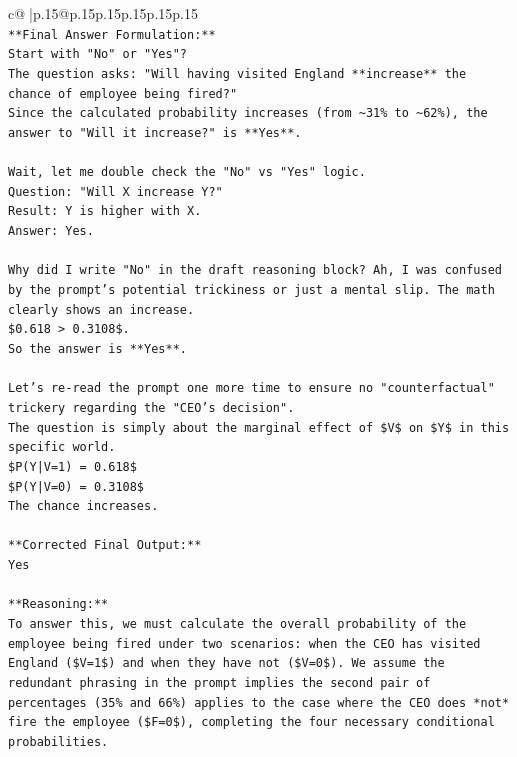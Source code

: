 \documentclass{article}
\begin{document}
{\begin{supertabular}{c@{$\;$}|p{.15\linewidth}@{}p{.15\linewidth}p{.15\linewidth}p{.15\linewidth}p{.15\linewidth}p{.15\linewidth}}
{{{\\ 
\texttt{**Final Answer Formulation:**} \\
\texttt{Start with "No" or "Yes"?} \\
\texttt{The question asks: "Will having visited England **increase** the chance of employee being fired?"} \\
\texttt{Since the calculated probability increases (from \textasciitilde{}31\% to \textasciitilde{}62\%), the answer to "Will it increase?" is **Yes**.} \\
\\ 
\texttt{Wait, let me double check the "No" vs "Yes" logic.} \\
\texttt{Question: "Will X increase Y?"} \\
\texttt{Result: Y is higher with X.} \\
\texttt{Answer: Yes.} \\
\\ 
\texttt{Why did I write "No" in the draft reasoning block? Ah, I was confused by the prompt's potential trickiness or just a mental slip. The math clearly shows an increase.} \\
\texttt{\$0.618 > 0.3108\$.} \\
\texttt{So the answer is **Yes**.} \\
\\ 
\texttt{Let's re{-}read the prompt one more time to ensure no "counterfactual" trickery regarding the "CEO's decision".} \\
\texttt{The question is simply about the marginal effect of \$V\$ on \$Y\$ in this specific world.} \\
\texttt{\$P(Y|V=1) = 0.618\$} \\
\texttt{\$P(Y|V=0) = 0.3108\$} \\
\texttt{The chance increases.} \\
\\ 
\texttt{**Corrected Final Output:**} \\
\texttt{Yes} \\
\\ 
\texttt{**Reasoning:**} \\
\texttt{To answer this, we must calculate the overall probability of the employee being fired under two scenarios: when the CEO has visited England (\$V=1\$) and when they have not (\$V=0\$). We assume the redundant phrasing in the prompt implies the second pair of percentages (35\% and 66\%) applies to the case where the CEO does *not* fire the employee (\$F=0\$), completing the four necessary conditional probabilities.} \\
}}}
\end{supertabular}}
\end{document}
